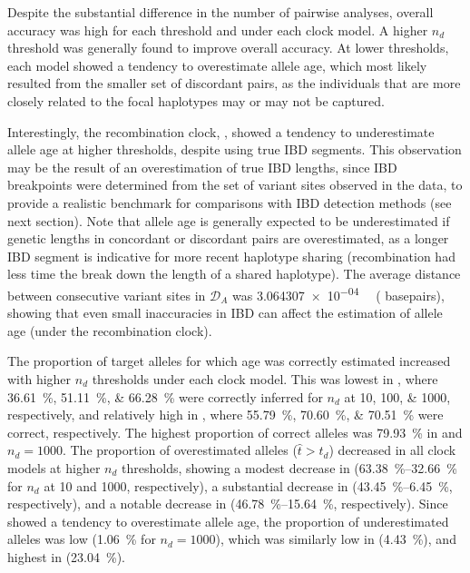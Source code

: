 %

%

Despite the substantial difference in the number of pairwise analyses, overall accuracy was high for each threshold and under each clock model.
A higher $n_d$ threshold was generally found to improve overall accuracy.
At lower thresholds, each model showed a tendency to overestimate allele age, which most likely resulted from the smaller set of discordant pairs, as the individuals that are more closely related to the focal haplotypes may or may not be captured.

Interestingly, the recombination clock, \ClockR, showed a tendency to underestimate allele age at higher thresholds, despite using true IBD segments.
This observation may be the result of an overestimation of true IBD lengths, since IBD breakpoints were determined from the set of variant sites observed in the data, to provide a realistic benchmark for comparisons with IBD detection methods (see next section).
Note that allele age is generally expected to be underestimated if genetic lengths in concordant or discordant pairs are overestimated, as a longer IBD segment is indicative for more recent haplotype sharing (\ie recombination had less time the break down the length of a shared haplotype).
The average distance between consecutive variant sites in ${\mathcal{D}_A}$ was \SI{3.064307e-04}{\centi\morgan} ( basepairs), showing that even small inaccuracies in IBD can affect the estimation of allele age (under the recombination clock).

The proportion of target alleles for which age was correctly estimated increased with higher $n_d$ thresholds under each clock model.
This was lowest in \ClockM, where \SIlist{36.61;51.11;66.28}{\percent} were correctly inferred for $n_d$ at \numlist{10;100;1000}, respectively, and relatively high in \ClockR, where \SIlist{55.79;70.60;70.51}{\percent} were correct, respectively.
The highest proportion of correct alleles was \SI{79.93}{\percent} in \ClockC and ${n_d = \num{1000}}$.
The proportion of overestimated alleles (${\hat{t} > t_d}$) decreased in all clock models at higher $n_d$ thresholds, showing a modest decrease in \ClockM (\SIrange{63.38}{32.66}{\percent} for $n_d$ at \num{10} and \num{1000}, respectively), a substantial decrease in \ClockR (\SIrange{43.45}{6.45}{\percent}, respectively), and a notable decrease in \ClockC (\SIrange{46.78}{15.64}{\percent}, respectively).
Since \ClockM showed a tendency to overestimate allele age, the proportion of underestimated alleles was low (\SI{1.06}{\percent} for ${n_d = \num{1000}}$), which was similarly low in \ClockC (\SI{4.43}{\percent}), and highest in \ClockR (\SI{23.04}{\percent}).

